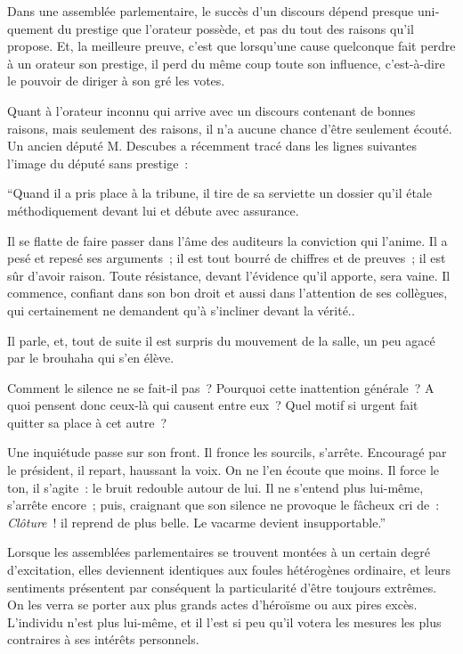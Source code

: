 \documentclass[french,twoside]{book} %
\begin{document}
Dans une assemblée parlementaire, le succès d’un discours dépend presque uni­quement du prestige que l’orateur possède, et pas du tout des raisons qu’il propose. Et, la meilleure preuve, c’est que lorsqu’une cause quelconque fait perdre à un orateur son prestige, il perd du même coup toute son influence, c’est-à-dire le pouvoir de diriger à son gré les votes.\par
Quant à l’orateur inconnu qui arrive avec un discours contenant de bonnes raisons, mais seulement des raisons, il n’a aucune chance d’être seulement écouté. Un ancien député M. Descubes a récemment tracé dans les lignes suivantes l’image du député sans prestige :\par
“Quand il a pris place à la tribune, il tire de sa serviette un dossier qu’il étale méthodiquement devant lui et débute avec assurance.\par
Il se flatte de faire passer dans l’âme des auditeurs la conviction qui l’anime. Il a pesé et repesé ses arguments ; il est tout bourré de chiffres et de preuves ; il est sûr d’avoir raison. Toute résistance, devant l’évidence qu’il apporte, sera vaine. Il com­mence, confiant dans son bon droit et aussi dans l’attention de ses collègues, qui certainement ne demandent qu’à s’incliner devant la vérité..\par
Il parle, et, tout de suite il est surpris du mouvement de la salle, un peu agacé par le brouhaha qui s’en élève.\par
Comment le silence ne se fait-il pas ? Pourquoi cette inattention générale ? A quoi pensent donc ceux-là qui causent entre eux ? Quel motif si urgent fait quitter sa place à cet autre ?\par
Une inquiétude passe sur son front. Il fronce les sourcils, s’arrête. Encouragé par le président, il repart, haussant la voix. On ne l’en écoute que moins. Il force le ton, il s’agite : le bruit redouble autour de lui. Il ne s’entend plus lui-même, s’arrête enco­re ; puis, craignant que son silence ne provoque le fâcheux cri de : \emph{Clôture} ! il reprend de plus belle. Le vacarme devient insupportable.”\par
Lorsque les assemblées parlementaires se trouvent montées à un certain degré d’excitation, elles deviennent identiques aux foules hétérogènes ordinaire, et leurs sentiments présentent par conséquent la particularité d’être toujours extrêmes. On les verra se porter aux plus grands actes d’héroïsme ou aux pires excès. L’individu n’est plus lui-même, et il l’est si peu qu’il votera les mesures les plus contraires à ses intérêts personnels.\par
\end{document}
